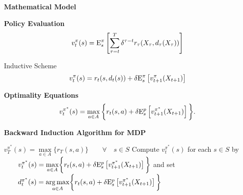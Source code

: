 \begin{frame}\begin{center}
\LARGE\textbf{Mathematical Model}
\end{center}\end{frame}
\begin{frame}
\textbf{Policy Evaluation}\vspace{0.3cm}
\begin{align*}
v^\pi_t(s) = \mathrm{E}^\pi_{s}\left[ \sum^T_{\tau=t} \delta^{\tau - t}   r_\tau(X_\tau, d_\tau(X_\tau)) \right]\\
\end{align*}

Inductive Scheme
\begin{align*}
v^\pi_t(s) = r_t(s, d_t(s)) + \delta\mathrm{E}^\pi_{s} \left[v^\pi_{t + 1}(X_{t + 1})\right]
\end{align*}
\end{frame}
\begin{frame}
\textbf{Optimality Equations}\vspace{0.3cm}
\begin{align*}\label{MPD Optimality}
v^{\pi^*}_t(s) = \max_{a \in A}\bigg\{ r_t(s, a) + \delta \mathrm{E}^p_{s} \left[v^{\pi^*}_{t + 1}(X_{t + 1})\right] \bigg\}.
\end{align*}
\end{frame}
\begin{frame}
\textbf{Backward Induction Algorithm for MDP}\vspace{0.5cm}

\begin{algorithmic}\small
{}
        \State $v^{\pi^*}_T(s) = \underset{a \in A}{\max}\bigg\{ r_T(s, a) \bigg\}\qquad \forall\quad s\in S$
    \Else
        \State Compute $v^{\pi^*}_t(s)$ for each $s\in S$ by
        \State $\qquad v^{\pi^*}_t(s) = \underset{a \in A}{\max}\bigg\{ r_t(s, a) + \delta\mathrm{E}^p_{s} \left[v^{\pi^*}_{t + 1}(X_{t + 1})\right] \bigg\}$
        \State and set
        \State $\qquad d^{\pi^*}_t(s) = \underset{a \in A}{\operatorname*{arg\,max}}\bigg\{ r_t(s, a) + \delta\mathrm{E}^p_{s} \left[v^{\pi^*}_{t + 1}(X_{t + 1})\right] \bigg\}$
    \EndIf
\EndFor
\end{algorithmic}
\end{frame}
